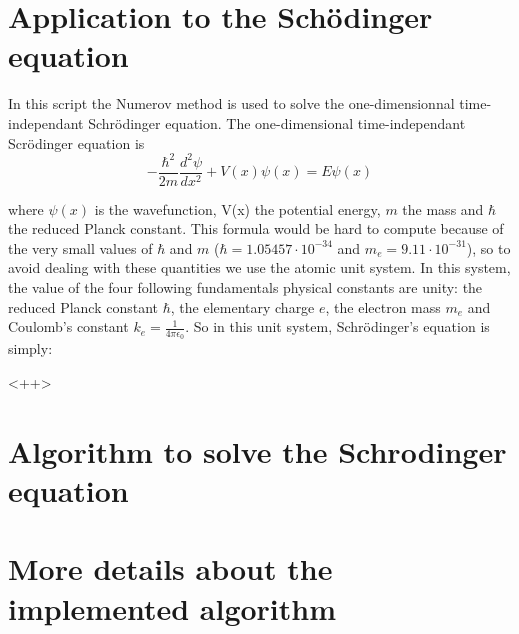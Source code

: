 \documentclass[12pt,twocolumn]{article}
\begin{document}
\section{Application to the Schödinger equation}

In this script the Numerov method is used to solve the one-dimensionnal time-independant Schrödinger equation. 
The one-dimensional time-independant Scrödinger equation is 
\begin{equation}
-\frac{\hbar^2}{2m}\frac{d^2\psi}{dx^2} + V(x)\psi(x) = E\psi(x)
  \label{SchrodEq}
\end{equation}

where $\psi(x)$ is the wavefunction, V(x) the potential energy, $m$ the mass and $\hbar$ the reduced Planck constant. This formula would be hard to compute because of the very small values
of $\hbar$ and $m$ ($\hbar = 1.05457 \cdot 10^{-34}$ and $m_e = 9.11\cdot10^{-31}$), so to avoid dealing with these quantities we use the atomic unit system. In this system, the value of the four
following fundamentals physical constants are unity:  the reduced Planck constant $\hbar$, the elementary charge $e$, the electron mass $m_e$ and Coulomb's constant $k_e = \frac{1}{4\pi\epsilon_0}$.
So in this unit system, Schrödinger's equation is simply:

\begin{equation}
  
  \label{}
\end{equation}<++>



\section{Algorithm to solve the Schrodinger equation}



\section{More details about the implemented algorithm}
\end{document}
